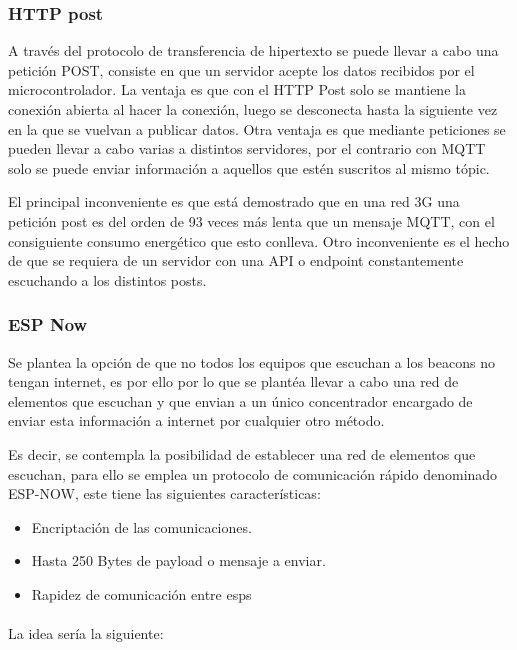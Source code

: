 \documentclass[a4paper ,12pt, onecolumn]{article}
\begin{document}
\begin{enumerate}
            \subsubsection {HTTP post}
                A través del protocolo de transferencia de hipertexto se puede llevar a cabo una petición POST, consiste en que
                un servidor acepte los datos recibidos por el microcontrolador.
                La ventaja es que con el HTTP Post solo se mantiene la conexión abierta al hacer la conexión, luego se desconecta hasta 
                la siguiente vez en la que se vuelvan a publicar datos. Otra ventaja es que mediante peticiones se pueden llevar a 
                cabo varias a distintos servidores, por el contrario con MQTT solo se puede enviar información a aquellos que estén
                suscritos al mismo tópic.

                El principal inconveniente es que está demostrado que en una red 3G una petición post es del orden de 93 veces
                más lenta que un mensaje MQTT, con el consiguiente consumo energético que esto conlleva. Otro inconveniente es el hecho 
                de que se requiera de un servidor con una API o endpoint constantemente escuchando a los distintos posts.
            \subsubsection {ESP Now}
                Se plantea la opción de que no todos los equipos que escuchan a los beacons no tengan internet, es por ello por lo 
                que se plantéa llevar a cabo una red de elementos que escuchan y que envian a un único concentrador encargado de enviar
                esta información a internet por cualquier otro método.

                Es decir, se contempla la posibilidad de establecer una red de elementos que escuchan, para ello se emplea 
                un protocolo de comunicación rápido denominado ESP-NOW, este tiene las siguientes características:
                \begin{itemize}
                    \item Encriptación de las comunicaciones.
                    \item Hasta 250 Bytes de payload o mensaje a enviar.
                    \item Rapidez de comunicación entre esps
                \end{itemize}
                \paragraph{}
                La idea sería la siguiente:

\end{enumerate}
\end{document}

